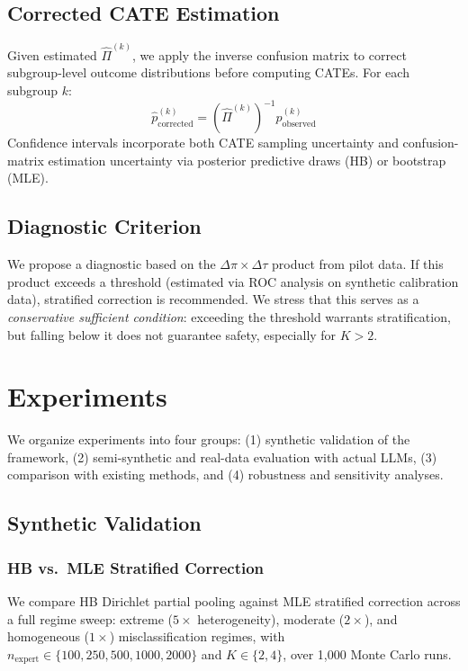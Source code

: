 \documentclass[11pt,a4paper]{article}
\begin{document}
\subsection{Corrected CATE Estimation}

Given estimated $\hat{\Pi}^{(k)}$, we apply the inverse confusion matrix to correct subgroup-level outcome distributions before computing CATEs. For each subgroup $k$:
\begin{equation}
\hat{p}_{\text{corrected}}^{(k)} = (\hat{\Pi}^{(k)})^{-1} \hat{p}_{\text{observed}}^{(k)}
\end{equation}
Confidence intervals incorporate both CATE sampling uncertainty and confusion-matrix estimation uncertainty via posterior predictive draws (HB) or bootstrap (MLE).

\subsection{Diagnostic Criterion}

We propose a diagnostic based on the $\Delta\pi \times \Delta\tau$ product from pilot data. If this product exceeds a threshold (estimated via ROC analysis on synthetic calibration data), stratified correction is recommended. We stress that this serves as a \emph{conservative sufficient condition}: exceeding the threshold warrants stratification, but falling below it does not guarantee safety, especially for $K > 2$.


\section{Experiments}
\label{sec:experiments}

We organize experiments into four groups: (1) synthetic validation of the framework, (2) semi-synthetic and real-data evaluation with actual LLMs, (3) comparison with existing methods, and (4) robustness and sensitivity analyses.

\subsection{Synthetic Validation}

\subsubsection{HB vs.\ MLE Stratified Correction}

We compare HB Dirichlet partial pooling against MLE stratified correction across a full regime sweep: extreme ($5\times$ heterogeneity), moderate ($2\times$), and homogeneous ($1\times$) misclassification regimes, with $n_{\text{expert}} \in \{100, 250, 500, 1000, 2000\}$ and $K \in \{2, 4\}$, over 1{,}000 Monte Carlo runs.
\end{document}
